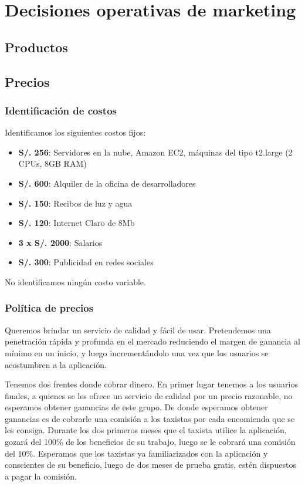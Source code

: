\chapter{Decisiones operativas de marketing}

\section{Productos}

\section{Precios}

\subsection{Identificación de costos}

Identificamos los siguientes costos fijos:

\begin{itemize}
\item \textbf{S/. 256}: Servidores en la nube, Amazon EC2, máquinas del tipo t2.large (2 CPUs, 8GB RAM)
\item \textbf{S/. 600}: Alquiler de la oficina de desarrolladores
\item \textbf{S/. 150}: Recibos de luz y agua
\item \textbf{S/. 120}: Internet Claro de 8Mb
\item \textbf{3 x S/. 2000}: Salarios
\item \textbf{S/. 300}: Publicidad en redes sociales
\end{itemize}

No identificamos ningún costo variable.

\subsection{Política de precios}

Queremos brindar un servicio de calidad y fácil de usar. Pretendemos una penetración rápida y profunda en el mercado reduciendo el margen de ganancia al mínimo en un inicio, y luego incrementándolo una vez que los usuarios se acostumbren a la aplicación.

Tenemos dos frentes donde cobrar dinero. En primer lugar tenemos a los usuarios finales, a quienes se les ofrece un servicio de calidad por un precio razonable, no esperamos obtener ganancias de este grupo. De donde esperamos obtener ganancias es de cobrarle una comisión a los taxistas por cada encomienda que se les consiga. Durante los dos primeros meses que el taxista utilice la aplicación, gozará del 100\% de los beneficios de su trabajo, luego se le cobrará una comisión del 10\%. Esperamos que los taxistas ya familiarizados con la aplicación y conscientes de su beneficio, luego de dos meses de prueba gratis, estén dispuestos a pagar la comisión.

